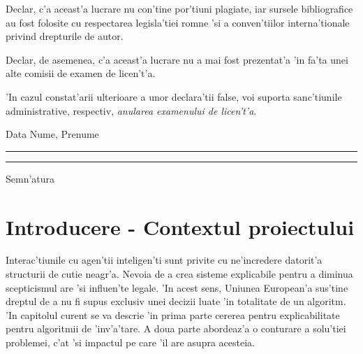 \documentclass[12pt,a4paper,twoside]{report}
\newcommand{\uline}[1]{\rule[0pt]{#1}{0.4pt}}
\begin{document}
Declar, c'a aceast'a lucrare nu con'tine por'tiuni plagiate, iar sursele bibliografice au fost folosite cu respectarea legisla'tiei rom\ia ne 'si a conven'tiilor interna'tionale privind drepturile de autor.

Declar, de asemenea, c'a aceast'a lucrare nu a mai fost prezentat'a 'in fa'ta unei alte comisii de examen de licen't'a.

'In cazul constat'arii ulterioare a unor declara'tii false, voi suporta sanc'tiunile administrative, respectiv, \emph{anularea examenului de licen't'a}.

\vspace{1.5cm}

Data \hspace{8cm} Nume, Prenume

\vspace{0.5cm}

\uline{3cm} \hspace{5cm} \uline{5cm}

\vspace{1cm}
\hspace{9.4cm}Semn'atura

\thispagestyle{empty}

\newpage


 

\setcounter{page}{1}

\newpage

\tableofcontents

\newpage


\setcounter{page}{1}

\chapter{Introducere - Contextul proiectului}

\pagestyle{headings}

 Interac'tiunile cu agen'tii inteligen'ti sunt privite cu ne'incredere datorit'a structurii de cutie neagr'a. Nevoia de a crea sisteme explicabile pentru a diminua scepticismul are 'si influen'te legale. 'In acest sens, Uniunea European'a sus'tine dreptul de a nu fi supus exclusiv unei decizii luate 'in totalitate de un algoritm. 'In capitolul curent se va descrie 'in prima parte cererea pentru explicabilitate pentru algoritmii de 'inv'a'tare. A doua parte abordeaz'a o conturare a solu'tiei problemei, c'at 'si impactul pe care 'il are asupra acesteia.
 
\end{document}
